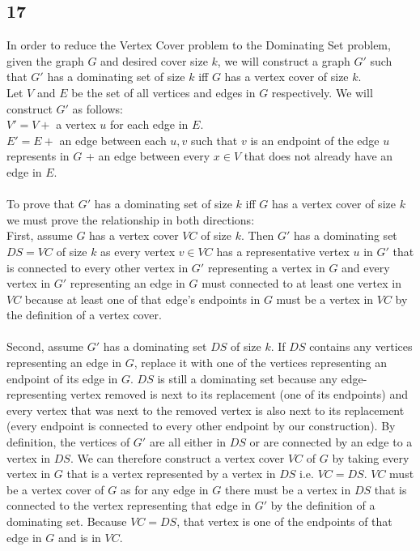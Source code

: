 \documentclass[letterpaper,notitlepage,twoside]{article}
\begin{document}
\subsection*{17}
In order to reduce the Vertex Cover problem to the Dominating Set problem, given the graph $G$ and desired cover size $k$, we will construct a graph $G'$ such that $G'$ has a dominating set of size $k$ iff $G$ has a vertex cover of size $k$. \\
Let $V$ and $E$ be the set of all vertices and edges in $G$ respectively. We will construct $G'$ as follows: \\
$V' = V + $ a vertex $u$ for each edge in $E$.\\
$E' = E + $ an edge between each $u, v$ such that $v$ is an endpoint of the edge $u$ represents in $G$ + an edge between every $x \in V$ that does not already have an edge in $E$.\\\\
To prove that $G'$ has a dominating set of size $k$ iff $G$ has a vertex cover of size $k$ we must prove the relationship in both directions: \\
First, assume $G$ has a vertex cover $VC$ of size $k$. Then $G'$ has a dominating set $DS = VC$ of size $k$ as every vertex $v \in VC$ has a representative vertex $u$ in $G'$ that is connected to every other vertex in $G'$ representing a vertex in $G$ and every vertex in $G'$ representing an edge in $G$ must connected to at least one vertex in $VC$ because at least one of that edge's endpoints in $G$ must be a vertex in $VC$ by the definition of a vertex cover. \\\\
Second, assume $G'$ has a dominating set $DS$ of size $k$. If $DS$ contains any vertices representing an edge in $G$, replace it with one of the vertices representing an endpoint of its edge in $G$. $DS$ is still a dominating set because any edge-representing vertex removed is next to its replacement (one of its endpoints) and every vertex that was next to the removed vertex is also next to its replacement (every endpoint is connected to every other endpoint by our construction). By definition, the vertices of $G'$ are all either in $DS$ or are connected by an edge to a vertex in $DS$. We can therefore construct a vertex cover $VC$ of $G$ by taking every vertex in $G$ that is a vertex represented by a vertex in $DS$ i.e. $VC = DS$. $VC$ must be a vertex cover of $G$ as for any edge in $G$ there must be a vertex in $DS$ that is connected to the vertex representing that edge in $G'$ by the definition of a dominating set. Because $VC = DS$, that vertex is one of the endpoints of that edge in $G$ and is in $VC$.
\end{document}
